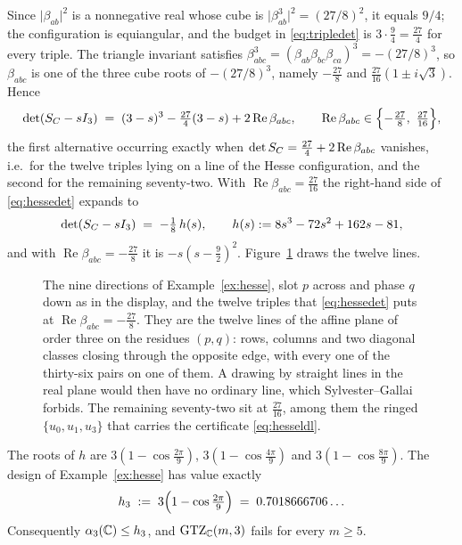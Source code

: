 Since $\lvert\beta_{ab}\rvert^{2}$ is a nonnegative real whose cube is
$\lvert\beta_{ab}^{3}\rvert^{2}=(27/8)^{2}$, it equals $9/4$; the
configuration is equiangular, and the budget in \eqref{eq:tripledet} is
$3\cdot\tfrac94=\tfrac{27}4$ for every triple.  The triangle invariant
satisfies $\beta_{abc}^{3}=(\beta_{ab}\beta_{bc}\beta_{ca})^{3}=-(27/8)^{3}$, so $\beta_{abc}$
is one of the three cube roots of $-(27/8)^3$, namely $-\tfrac{27}8$ and
$\tfrac{27}{16}(1\pm i\sqrt3)$.  Hence
\begin{equation}\label{eq:hessedet}
  \det(\SC-sI_3)\;=\;(3-s)^{3}-\tfrac{27}4(3-s)+2\operatorname{Re}\beta_{abc},
  \qquad \operatorname{Re}\beta_{abc}\in\Bigl\{-\tfrac{27}8,\ \tfrac{27}{16}\Bigr\},
\end{equation}
the first alternative occurring exactly when $\det S_{C}=\tfrac{27}4+2\operatorname{Re}\beta_{abc}$
vanishes, i.e.\ for the twelve triples lying on a line of the Hesse
configuration, and the second for the remaining seventy-two.  With
$\operatorname{Re}\beta_{abc}=\tfrac{27}{16}$ the right-hand side of
\eqref{eq:hessedet} expands to
\begin{equation}\label{eq:hessecubic}
  \det(S_{C}-sI_3)\;=\;-\tfrac18\,h(s),
  \qquad
  h(s):=8s^{3}-72s^{2}+162s-81 ,
\end{equation}
and with $\operatorname{Re}\beta_{abc}=-\tfrac{27}8$ it is $-s(s-\tfrac92)^{2}$.
Figure~\ref{fig:hesse} draws the twelve lines.

\begin{figure}[ht]
  \centering
  
  \caption{The nine directions of Example~\ref{ex:hesse}, slot $p$ across and
  phase $q$ down as in the display, and the twelve triples that
  \eqref{eq:hessedet} puts at $\operatorname{Re}\beta_{abc}=-\tfrac{27}{8}$.
  They are the twelve lines of the affine plane of order three on the residues
  $(p,q)$: rows, columns and two diagonal classes closing through the opposite
  edge, with every one of the thirty-six pairs on one of them.  A drawing by
  straight lines in the real plane would then have no ordinary line, which
  Sylvester--Gallai forbids.  The remaining seventy-two sit at
  $\tfrac{27}{16}$, among them the ringed $\{u_0,u_1,u_3\}$ that carries the
  certificate \eqref{eq:hesseldl}.}
  \label{fig:hesse}
\end{figure}

\begin{proposition}[Lean]\label{prop:hesse}
The roots of $h$ are $3(1-\cos\tfrac{2\pi}9)$,
$3(1-\cos\tfrac{4\pi}9)$ and $3(1-\cos\tfrac{8\pi}9)$.  The design of
Example~\ref{ex:hesse} has value exactly
\[
  h_3\;:=\;3\Bigl(1-\cos\tfrac{2\pi}9\Bigr)\;=\;0.7018666706\ldots
\]
Consequently $\alpha_3(\mathbb{C})\le h_3$, and $\mathrm{GTZ}_{\mathbb{C}}(m,3)$ fails for every
$m\ge5$.
\end{proposition}

